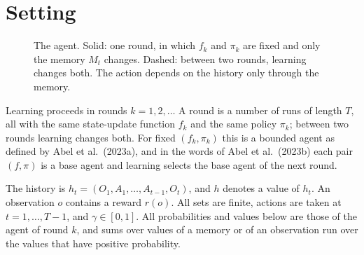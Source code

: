 \documentclass[11pt]{article}
\theoremstyle{definition}
\begin{document}
\section{Setting}

\begin{figure}[h]
\centering
{}
\caption{The agent. Solid: one round, in which $f_k$ and $\pi_k$ are fixed and only the memory $M_t$ changes. Dashed: between two rounds, learning changes both. The action depends on the history only through the memory.}\label{fig:agent}
\end{figure}

Learning proceeds in rounds $k=1,2,\dots$ A round is a number of runs of length $T$, all with the same state-update function $f_k$ and the same policy $\pi_k$; between two rounds learning changes both. For fixed $(f_k,\pi_k)$ this is a bounded agent as defined by Abel et al.\ (2023a), and in the words of Abel et al.\ (2023b) each pair $(f,\pi)$ is a base agent and learning selects the base agent of the next round.

The history is $h_t=(O_1,A_1,\dots,A_{t-1},O_t)$, and $h$ denotes a value of $h_t$. An observation $o$ contains a reward $r(o)$. All sets are finite, actions are taken at $t=1,\dots,T-1$, and $\gamma\in[0,1]$. All probabilities and values below are those of the agent of round $k$, and sums over values of a memory or of an observation run over the values that have positive probability.
\end{document}
